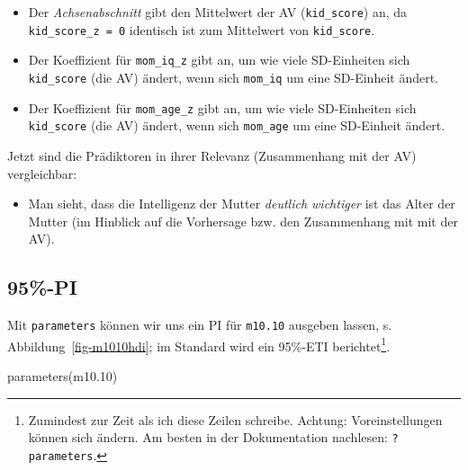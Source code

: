 \documentclass[
  a4paper,
  DIV=11]{scrreprt}
\newenvironment{Shaded}{\begin{snugshade}}{\end{snugshade}}
\newcommand{\FloatTok}[1]{\textcolor[rgb]{0.68,0.00,0.00}{#1}}
\newcommand{\FunctionTok}[1]{\textcolor[rgb]{0.28,0.35,0.67}{#1}}
\newcommand{\NormalTok}[1]{\textcolor[rgb]{0.00,0.23,0.31}{#1}}
\providecommand{\tightlist}{%
  \setlength{\itemsep}{0pt}\setlength{\parskip}{0pt}}\usepackage{longtable,booktabs,array}
\theoremstyle{definition}
\theoremstyle{remark}
\begin{document}
\begin{itemize}
\tightlist
\item
  Der \emph{Achsenabschnitt} gibt den Mittelwert der AV
  (\texttt{kid\_score}) an, da \texttt{kid\_score\_z\ =\ 0} identisch
  ist zum Mittelwert von \texttt{kid\_score}.
\item
  Der Koeffizient für \texttt{mom\_iq\_z} gibt an, um wie viele
  SD-Einheiten sich \texttt{kid\_score} (die AV) ändert, wenn sich
  \texttt{mom\_iq} um eine SD-Einheit ändert.
\item
  Der Koeffizient für \texttt{mom\_age\_z} gibt an, um wie viele
  SD-Einheiten sich \texttt{kid\_score} (die AV) ändert, wenn sich
  \texttt{mom\_age} um eine SD-Einheit ändert.
\end{itemize}

Jetzt sind die Prädiktoren in ihrer Relevanz (Zusammenhang mit der AV)
vergleichbar:

\begin{itemize}
\tightlist
\item
  Man sieht, dass die Intelligenz der Mutter \emph{deutlich wichtiger}
  ist das Alter der Mutter (im Hinblick auf die Vorhersage bzw. den
  Zusammenhang mit mit der AV).
\end{itemize}

\hypertarget{pi}{%
\subsection{95\%-PI}\label{pi}}

Mit \texttt{parameters} können wir uns ein PI für \texttt{m10.10}
ausgeben lassen, s. Abbildung~\ref{fig-m1010hdi}; im Standard wird ein
95\%-ETI berichtet\footnote{Zumindest zur Zeit als ich diese Zeilen
  schreibe. Achtung: Voreinstellungen können sich ändern. Am besten in
  der Dokumentation nachlesen: \texttt{?parameters}.}.

\begin{Shaded}
\begin{Highlighting}[]
\FunctionTok{parameters}\NormalTok{(m10}\FloatTok{.10}\NormalTok{) }
\end{Highlighting}
\end{Shaded}
\end{document}
